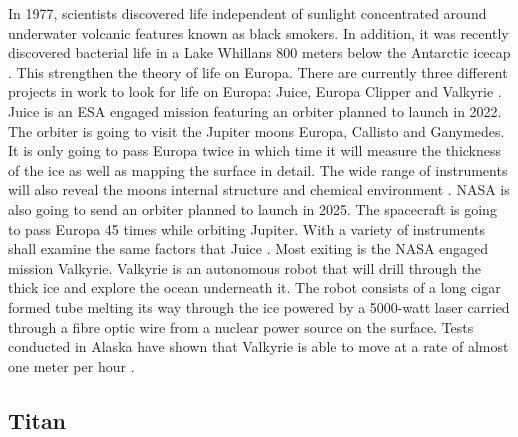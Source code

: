 \begin{multicols}{2}
In 1977, scientists discovered life independent of sunlight concentrated around underwater volcanic features known as black smokers.
In addition, it was recently discovered bacterial life in a Lake Whillans 800 meters below the Antarctic icecap \cite{FPlan04}. This strengthen the theory of life on Europa.
There are currently three different projects in work to look for life on Europa: Juice, Europa Clipper and Valkyrie \cite{FPlan24}.
Juice is an ESA engaged mission featuring an orbiter planned to launch in 2022.
The orbiter is going to visit the Jupiter moons Europa, Callisto and Ganymedes.
It is only going to pass Europa twice in which time it will measure the thickness of the ice as well as mapping the surface in detail.
The wide range of instruments will also reveal the moons internal structure and chemical environment \cite{FPlan24}.
NASA is also going to send an orbiter planned to launch in 2025.
The spacecraft is going to pass Europa 45 times while orbiting Jupiter.
With a variety of instruments shall examine the same factors that Juice \cite{FPlan24}.
Most exiting is the NASA engaged mission Valkyrie.
Valkyrie is an autonomous robot that will drill through the thick ice and explore the ocean underneath it.
The robot consists of a long cigar formed tube melting its way through the ice powered by a 5000-watt laser carried through a fibre optic wire from a nuclear power source on the surface.
Tests conducted in Alaska have shown that Valkyrie is able to move at a rate of almost one meter per hour \cite{FPlan24} \cite{FPlan25}.

\subsection*{Titan}


 

\end{multicols}
